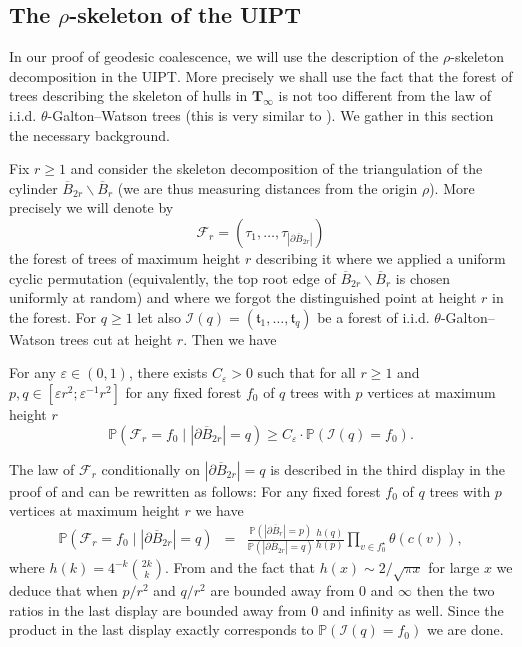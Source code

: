 \documentclass[10pt]{amsart}
\theoremstyle{definition}\newtheorem{defi}[theo]{Definition}\newtheorem{rema}[theo]{Remark}\newtheorem{exam}[theo]{Example}\newtheorem{exem}[theo]{Example}\newtheorem{nota}[theo]{Notation}
\begin{document}
\subsection{The \texorpdfstring{$\rho$-}{rho-}skeleton of the UIPT}

In our proof of geodesic coalescence, we will use the description of the $\rho$-skeleton decomposition in the UIPT. More precisely we shall use the fact that the forest of trees describing the skeleton of hulls in $ \mathbf{T}_{\infty}$ is not too different from the law of i.i.d. $\theta$-Galton--{Watson} trees (this is very similar to \cite[Proposition 5]{CLGfpp}). We gather in this section the necessary background.\medskip

 Fix $r \geq 1$ and consider the skeleton decomposition of the triangulation of the cylinder $ \overline{B}_{2r} \backslash \overline{B}_{r}$ (we are thus measuring distances from the origin $\rho$). More precisely we will denote by $$ \mathcal{F}_{r} = (\tau_{1}, \dots , \tau_{| \partial \overline{B}_{2r}|})$$ the forest of trees of maximum height $r$ describing it where we applied a uniform cyclic permutation (equivalently, the top root edge of $\overline{B}_{2r} \backslash \overline{B}_{r}$ is chosen uniformly at random) and where we forgot the distinguished point at height $r$ in the forest. For $q \geq 1$ let also $ \mathcal{I}(q) = (  \mathfrak{t}_{1}, \dots , \mathfrak{t}_{q})$ be a forest of i.i.d. $\theta$-Galton--Watson trees cut at height $r$. Then we have
 \begin{lemma} \label{lem:comparison} For any $ \varepsilon \in (0,1)$, there exists $C_{\varepsilon}>0$ such that for all $r\geq 1$ and $ p,q  \in [ \varepsilon r^{2};  \varepsilon^{-1} r^{2}]$ for any fixed forest $f_{0}$ of $q$  trees with $p$ vertices at maximum height $r$
 $$ \mathbb{P}( \mathcal{F}_{r} = f_{0} \mid | \partial \overline{B}_{2r}| = q) \geq C_{\varepsilon} \cdot \mathbb{P}( \mathcal{I}(q) = f_{0}).$$
 \end{lemma}
 \proof The law of $ \mathcal{F}_{r}$ conditionally on $| \partial \overline{B}_{2r}| = q$ is described in the third display in the proof of \cite[Proposition 5]{CLGfpp} and can be rewritten as follows: For any  fixed forest $f_{0}$ of $q$ trees with $p$ vertices at maximum height $r$ we have
 \begin{eqnarray} \mathbb{P}( \mathcal{F}_{r} = f_{0} \mid | \partial \overline{B}_{2r}| = q) &=&  \frac{\mathbb{P}( |\partial \overline{B}_{r}|=p)}{ \mathbb{P}(| \partial \overline{B}_{2r}| = q)} \frac{h(q)}{h(p)} \prod_{v \in f_{0}^{\star}} \theta(c(v)), %
\end{eqnarray}
where $h(k)= 4^{-k}{\binom{2k}{k}}$. From \cite[Remark 3]{CLGfpp} and the fact that $ h(x) \sim 2/ \sqrt{\pi x}$ for large $x$ we deduce that when $p/r^{2}$ and $q/r^{2}$ are bounded away from $0$ and $\infty$ then the two ratios in the last display are bounded away from $0$ and infinity as well. Since the product in the last display exactly corresponds to $\mathbb{P}( \mathcal{I}(q) = f_{0})$ we are done. \endproof
\end{document}
